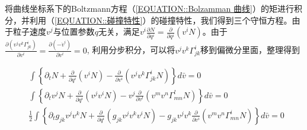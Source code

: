 \documentclass[LBMDerivation.tex]{subfiles}
\begin{document}
%

将曲线坐标系下的Boltzmann方程（\ref{EQUATION::Bolzamman 曲线}）的矩进行积分，并利用（\ref{EQUATION::碰撞特性}）的碰撞特性，我们得到三个守恒方程。由于粒子速度$v^j$与位置参数$q$无关，满足$v^i \frac{\partial N}{\partial q^i}=\frac{\partial}{\partial q^i}(v^i N)$。由于$\frac{\partial (v^j v^k \Gamma_{jk}^i)}{\partial v^i}=\frac{\partial(-\dot{v}^i)}{\partial v^i}=0$, 利用分步积分，可以将$v^j v^k \Gamma_{jk}^i$移到偏微分里面，整理得到

%
%




\begin{equation}
  \begin{aligned}
     & \int  \left\{\partial_{t} N+\frac{\partial}{\partial q^{i}}\left(v^{i} N\right)-\frac{\partial}{\partial v^{i}}\left( v^{j} v^{k} \Gamma_{j k}^{i} N\right)\right\}d\bar{v}=0                                                                     \\
     & \int \left\{\partial_{t}  v^{j} N+\frac{\partial}{\partial q^{i}}\left( v^{j} v^{i} N\right)-v^{j}\frac{\partial}{\partial v^{l}}\left(  v^{m} v^{n} \Gamma_{mn}^{l} N\right)\right\}d \bar{v}=0                                                  \\
     & \frac{1}{2}\int \left\{\partial_{t} g_{jk} v^{j}v^{k} N+ \frac{\partial}{\partial q^{i}}\left( g_{jk}v^{j} v^{k} v^{i} N\right)- g_{jk} v^{j}v^{k}  \frac{\partial}{\partial v^{i}}\left( v^{m} v^{n} \Gamma_{mn}^{i} N\right)\right\}d \bar{v}=0 \\
  \end{aligned}
  \label{EQUATION::A.12} ~
\end{equation}
%
\end{document}

